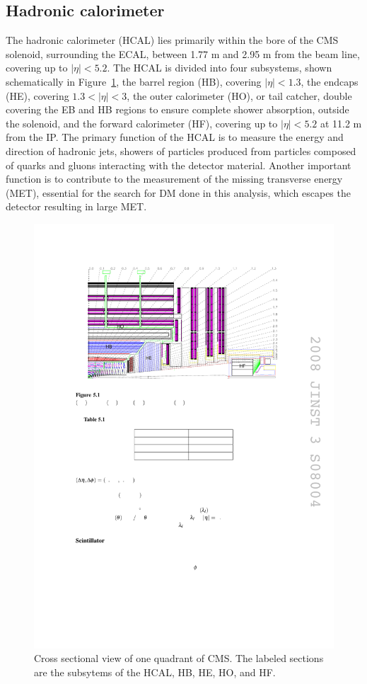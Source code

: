 \subsection{Hadronic calorimeter}

The hadronic calorimeter (HCAL) lies primarily within the bore of the CMS solenoid, surrounding the ECAL, between 1.77 m and 2.95 m from the beam line, covering up to $|\eta|<5.2$. The HCAL is divided into four subsystems, shown schematically in Figure~\ref{fig:hcal}, the barrel region (HB), covering $|\eta|<1.3$, the endcaps (HE), covering $1.3<|\eta|<3$, the outer calorimeter (HO), or tail catcher, double covering the EB and HB regions to ensure complete shower absorption, outside the solenoid, and the forward calorimeter (HF), covering up to $|\eta|<5.2$ at 11.2 m from the IP. The primary function of the HCAL is to measure the energy and direction of hadronic jets, showers of particles produced from particles composed of quarks and gluons interacting with the detector material. Another important function is to contribute to the measurement of the missing transverse energy (MET), essential for the search for DM done in this analysis, which escapes the detector resulting in large MET. 

\begin{figure}[tbh]
\centering
\includegraphics[width=6in]{figures/hcal.pdf}
\caption{Cross sectional view of one quadrant of CMS. The labeled sections are the subsytems of the HCAL, HB, HE, HO, and HF.}
\label{fig:hcal}
\end{figure}

